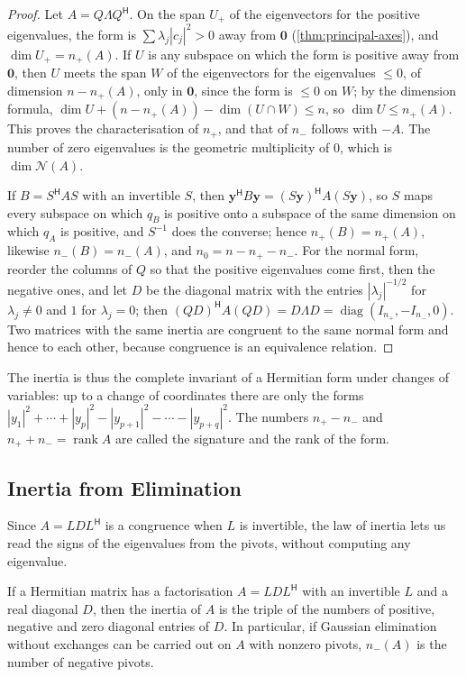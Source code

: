 \begin{proof}
Let $A=Q\Lambda Q^{\mathsf H}$. On the span $U_+$ of the eigenvectors for the positive eigenvalues, the form is $\sum\lambda_j|c_j|^2>0$ away from $\mathbf 0$ (\cref{thm:principal-axes}), and $\dim U_+=n_+(A)$. If $U$ is any subspace on which the form is positive away from $\mathbf 0$, then $U$ meets the span $W$ of the eigenvectors for the eigenvalues $\le0$, of dimension $n-n_+(A)$, only in $\mathbf 0$, since the form is $\le0$ on $W$; by the dimension formula, $\dim U+(n-n_+(A))-\dim(U\cap W)\le n$, so $\dim U\le n_+(A)$. This proves the characterisation of $n_+$, and that of $n_-$ follows with $-A$. The number of zero eigenvalues is the geometric multiplicity of $0$, which is $\dim\mathcal N(A)$.

If $B=S^{\mathsf H}AS$ with an invertible $S$, then $\mathbf y^{\mathsf H}B\mathbf y=(S\mathbf y)^{\mathsf H}A(S\mathbf y)$, so $S$ maps every subspace on which $q_B$ is positive onto a subspace of the same dimension on which $q_A$ is positive, and $S^{-1}$ does the converse; hence $n_+(B)=n_+(A)$, likewise $n_-(B)=n_-(A)$, and $n_0=n-n_+-n_-$. For the normal form, reorder the columns of $Q$ so that the positive eigenvalues come first, then the negative ones, and let $D$ be the diagonal matrix with the entries $|\lambda_j|^{-1/2}$ for $\lambda_j\ne0$ and $1$ for $\lambda_j=0$; then $(QD)^{\mathsf H}A(QD)=D\Lambda D=\operatorname{diag}(I_{n_+},-I_{n_-},0)$. Two matrices with the same inertia are congruent to the same normal form and hence to each other, because congruence is an equivalence relation.
\end{proof}

The inertia is thus the complete invariant of a Hermitian form under changes of variables: up to a change of coordinates there are only the forms $|y_1|^2+\cdots+|y_p|^2-|y_{p+1}|^2-\cdots-|y_{p+q}|^2$. The numbers $n_+-n_-$ and $n_++n_-=\operatorname{rank}A$ are called the signature and the rank of the form.

\subsection{Inertia from Elimination}

Since $A=LDL^{\mathsf H}$ is a congruence when $L$ is invertible, the law of inertia lets us read the signs of the eigenvalues from the pivots, without computing any eigenvalue.

\begin{proposition}
\label{prop:inertia-ldl}
If a Hermitian matrix has a factorisation $A=LDL^{\mathsf H}$ with an invertible $L$ and a real diagonal $D$, then the inertia of $A$ is the triple of the numbers of positive, negative and zero diagonal entries of $D$. In particular, if Gaussian elimination without exchanges can be carried out on $A$ with nonzero pivots, $n_-(A)$ is the number of negative pivots.
\end{proposition}

